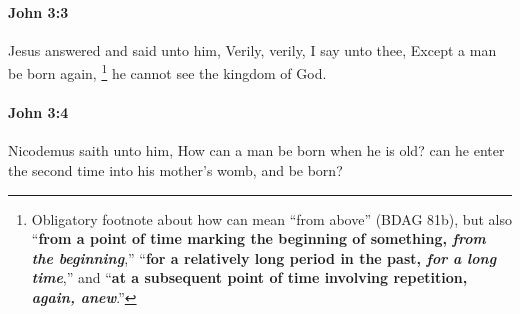 		\paragraph{John 3:3} %
			\label{JOHN-3-3}

			Jesus answered and said unto him, Verily, verily, I say unto thee, Except a man be born again,%
				\footnote{%
					Obligatory footnote about how  can mean ``from above'' (BDAG 81b), but also ``\textbf{from a point of time marking the beginning of something, \textit{from the beginning}},'' ``\textbf{for a relatively long period in the past, \textit{for a long time}},'' and ``\textbf{at a subsequent point of time involving repetition, \textit{again, anew}}.''
					}
			he cannot see the kingdom of God.

			\begin{framed}
			\scriptsize
				\begin{compactdesc}
					\item[SBLG] 
				\end{compactdesc}
			\end{framed}

		\paragraph{John 3:4} %
			\label{JOHN-3-4}

			Nicodemus saith unto him, How can a man be born when he is old? can he enter the second time into his mother's womb, and be born?

